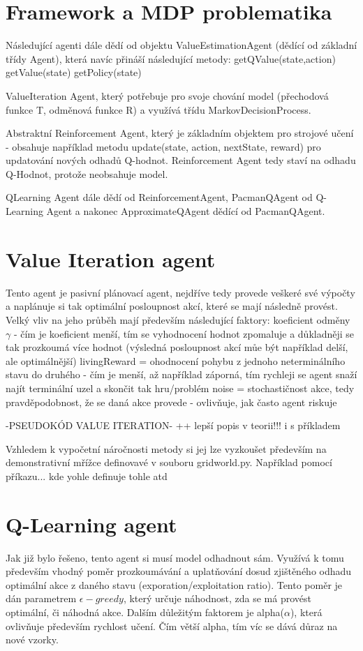 \section{Framework a MDP problematika}
Následující agenti dále dědí od objektu ValueEstimationAgent (dědící od základní třídy Agent), která navíc přináší následující metody:
getQValue(state,action)
getValue(state)
getPolicy(state)

ValueIteration Agent, který potřebuje pro svoje chování model (přechodová funkce T, odměnová funkce R) a využívá třídu MarkovDecisionProcess.

Abstraktní Reinforcement Agent, který je základním objektem pro strojové učení - obsahuje například metodu update(state, action, nextState, reward) pro updatování nových odhadů Q-hodnot.
Reinforcement Agent tedy staví na odhadu Q-Hodnot, protože neobsahuje model.

QLearning Agent dále dědí od ReinforcementAgent, PacmanQAgent od Q-Learning Agent a nakonec ApproximateQAgent dědící od PacmanQAgent.

\section{Value Iteration agent}
Tento agent je pasivní plánovací agent, nejdříve tedy provede veškeré své výpočty a naplánuje si tak optimální posloupnost akcí, které se mají následně provést. Velký vliv na jeho průběh mají především následující faktory:
koeficient odměny $\gamma$ - čím je koeficient menší, tím se vyhodnocení hodnot zpomaluje a důkladněji se tak prozkoumá více hodnot (výsledná posloupnost akcí můe být například delší, ale optimálnější)
livingReward = ohodnocení pohybu z jednoho neterminálního stavu do druhého - čím je menší, až například záporná, tím rychleji se agent snaží najít terminální uzel a skončit tak hru/problém
noise = stochastičnost akce, tedy pravděpodobnost, že se daná akce provede - ovlivňuje, jak často agent riskuje

-PSEUDOKÓD VALUE ITERATION- ++ lepší popis v teorii!!! i s příkladem

Vzhledem k vypočetní náročnosti metody si jej lze vyzkoušet především na demonstrativní mřížce definovavé v souboru gridworld.py. Například pomocí příkazu... kde yohle definuje tohle atd

\section{Q-Learning agent}
Jak již bylo řešeno, tento agent si musí model odhadnout sám. Využívá k tomu především vhodný poměr prozkoumávání a uplatňování dosud zjištěného odhadu optimální akce z daného stavu (exporation/exploitation ratio). Tento poměr je dán parametrem $\epsilon-greedy$, který určuje náhodnost, zda se má provést optimální, či náhodná akce. Dalším důležitým faktorem je alpha($\alpha$), která ovlivňuje především rychlost učení. Čím větší alpha, tím víc se dává důraz na nové vzorky.
